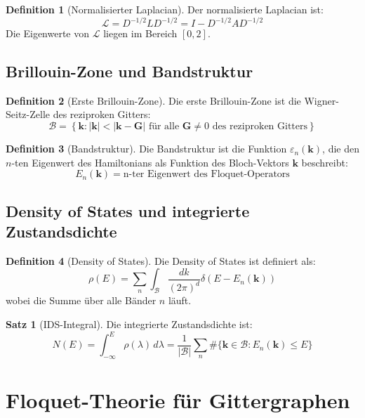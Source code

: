 \documentclass[a4paper,12pt]{article}
\theoremstyle{definition}
\newtheorem{definition}{Definition}[section]
\newtheorem{satz}{Satz}[section]
\begin{document}
\begin{definition}[Normalisierter Laplacian]
	Der normalisierte Laplacian ist:
	\[
	\mathcal{L} = D^{-1/2} L D^{-1/2} = I - D^{-1/2} A D^{-1/2}
	\]
	Die Eigenwerte von $\mathcal{L}$ liegen im Bereich $[0, 2]$.
\end{definition}

\subsection{Brillouin-Zone und Bandstruktur}

\begin{definition}[Erste Brillouin-Zone]
	Die erste Brillouin-Zone ist die Wigner-Seitz-Zelle des reziproken Gitters:
	\[
	\mathcal{B} = \left\{ \mathbf{k} : |\mathbf{k}| < |\mathbf{k} - \mathbf{G}| \text{ für alle } \mathbf{G} \neq 0 \text{ des reziproken Gitters} \right\}
	\]
\end{definition}

\begin{definition}[Bandstruktur]
	Die Bandstruktur ist die Funktion $\varepsilon_n(\mathbf{k})$, die den $n$-ten Eigenwert des Hamiltonians als Funktion des Bloch-Vektors $\mathbf{k}$ beschreibt:
	\[
	E_n(\mathbf{k}) = \text{n-ter Eigenwert des Floquet-Operators}
	\]
\end{definition}

\subsection{Density of States und integrierte Zustandsdichte}

\begin{definition}[Density of States]
	Die Density of States ist definiert als:
	\[
	\rho(E) = \sum_{n} \int_{\mathcal{B}} \frac{dk}{(2\pi)^d} \delta(E - E_n(\mathbf{k}))
	\]
	wobei die Summe über alle Bänder $n$ läuft.
\end{definition}

\begin{satz}[IDS-Integral]
	Die integrierte Zustandsdichte ist:
	\[
	N(E) = \int_{-\infty}^{E} \rho(\lambda) \, d\lambda = \frac{1}{|\mathcal{B}|} \sum_{n} \# \{ \mathbf{k} \in \mathcal{B} : E_n(\mathbf{k}) \leq E \}
	\]
\end{satz}

\section{Floquet-Theorie für Gittergraphen}
\end{document}
